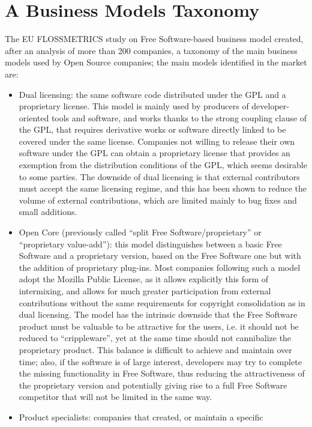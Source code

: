 \section*{A Business Models Taxonomy}

The EU FLOSSMETRICS study on Free Software-based business model created, after
an analysis of more than 200 companies, a taxonomy of the main business models
used by Open Source companies; the main models identified in the market are: 
\begin{itemize}
 \item Dual licensing: the same software code distributed under the GPL and a
proprietary license. This model is mainly used by producers of
developer-oriented tools and software, and works thanks to the strong coupling
clause of the GPL, that requires derivative works or software directly linked to
be covered under the same license. Companies not willing to release their own
software under the GPL can obtain a proprietary license that provides an
exemption from the distribution conditions of the GPL, which seems desirable to
some parties. The downside of dual licensing is that external contributors must
accept the same licensing regime, and this has been shown to reduce the volume
of external contributions, which are limited mainly to bug fixes and small
additions.
 \item Open Core (previously called ``split Free Software/proprietary'' or
``proprietary value-add''): this model distinguishes between a basic Free Software and a proprietary version, based on the Free Software one but with the addition of proprietary plug-ins. Most companies following such a model adopt the Mozilla Public License, as it allows explicitly this form of intermixing, and allows for much greater participation from external contributions without the same requirements for copyright consolidation as in dual licensing. The model has the intrinsic downside that the Free Software product must be valuable to be attractive for the users, i.e. it should not be reduced to ``crippleware'', yet at the same time should not cannibalize the proprietary product. This balance is difficult to achieve and maintain over time; also, if the software is of large interest, developers may try to complete the missing functionality in Free Software, thus reducing the attractiveness of the proprietary version and potentially giving rise to a full Free Software competitor that will not be limited in the same way.
 \item Product specialists: companies that created, or maintain a specific

\end{itemize}
